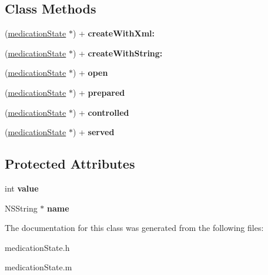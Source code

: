 \subsection*{Class Methods}
\begin{DoxyCompactItemize}
\item 
\hypertarget{interfacemedication_state_a5d5819c18af05d52f83e0d668efa88cc}{}(\hyperlink{interfacemedication_state}{medication\+State} $\ast$) + {\bfseries create\+With\+Xml\+:}\label{interfacemedication_state_a5d5819c18af05d52f83e0d668efa88cc}

\item 
\hypertarget{interfacemedication_state_aec4c1af6611a0227d1197ede0ad4698b}{}(\hyperlink{interfacemedication_state}{medication\+State} $\ast$) + {\bfseries create\+With\+String\+:}\label{interfacemedication_state_aec4c1af6611a0227d1197ede0ad4698b}

\item 
\hypertarget{interfacemedication_state_a81d2d57c38dbf1753903a95e4ba5d7c5}{}(\hyperlink{interfacemedication_state}{medication\+State} $\ast$) + {\bfseries open}\label{interfacemedication_state_a81d2d57c38dbf1753903a95e4ba5d7c5}

\item 
\hypertarget{interfacemedication_state_a25c8e90e9ff625facbc74c726d2a6ee6}{}(\hyperlink{interfacemedication_state}{medication\+State} $\ast$) + {\bfseries prepared}\label{interfacemedication_state_a25c8e90e9ff625facbc74c726d2a6ee6}

\item 
\hypertarget{interfacemedication_state_a5a94f263c11411940985a271a2238ffd}{}(\hyperlink{interfacemedication_state}{medication\+State} $\ast$) + {\bfseries controlled}\label{interfacemedication_state_a5a94f263c11411940985a271a2238ffd}

\item 
\hypertarget{interfacemedication_state_a9c9084352285cc7ccec41819b89a20eb}{}(\hyperlink{interfacemedication_state}{medication\+State} $\ast$) + {\bfseries served}\label{interfacemedication_state_a9c9084352285cc7ccec41819b89a20eb}

\end{DoxyCompactItemize}
\subsection*{Protected Attributes}
\begin{DoxyCompactItemize}
\item 
\hypertarget{interfacemedication_state_ad3fbf369862a9084bbbcb3d49eb3031e}{}int {\bfseries value}\label{interfacemedication_state_ad3fbf369862a9084bbbcb3d49eb3031e}

\item 
\hypertarget{interfacemedication_state_af3d8adff0747927933b96f8134062503}{}N\+S\+String $\ast$ {\bfseries name}\label{interfacemedication_state_af3d8adff0747927933b96f8134062503}

\end{DoxyCompactItemize}


The documentation for this class was generated from the following files\+:\begin{DoxyCompactItemize}
\item 
medication\+State.\+h\item 
medication\+State.\+m\end{DoxyCompactItemize}
